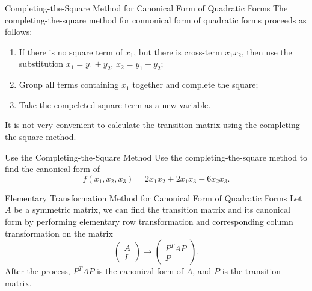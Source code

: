 \begin{proposition}{Completing-the-Square Method for Canonical Form of Quadratic
  Forms}{}
  The completing-the-square method for connonical form of quadratic forms
  proceeds as follows:
  \begin{enumerate}
  \item If there is no square term of $x_1$, but there is cross-term $x_1x_2$,
    then use the substitution $x_1 = y_1 + y_2$, $x_2 = y_1 - y_2$;
  \item Group all terms containing $x_1$ together and complete the square;
  \item Take the compeleted-square term as a new variable.
  \end{enumerate}
\end{proposition}

\begin{note}
  It is not very convenient to calculate the transition matrix using the
  completing-the-square method.
\end{note}

\begin{example}{Use the Completing-the-Square Method}{}
  Use the completing-the-square method to find the canonical form of
  \begin{equation}
    f(x_1, x_2, x_3) = 2x_1x_2 + 2x_1x_3 - 6x_2x_3.
  \end{equation}
\end{example}

\begin{solution}
  
\end{solution}

\begin{proposition}{Elementary Transformation Method for Canonical Form of
    Quadratic Forms}{}
  Let $A$ be a symmetric matrix, we can find the transition matrix and its
  canonical form by performing elementary row transformation and
  corresponding column transformation on the matrix
  \begin{equation}
    \begin{pmatrix}A\\I\end{pmatrix}\to\begin{pmatrix}P^TAP\\P\end{pmatrix}.
  \end{equation}
  After the process, $P^TAP$ is the canonical form of $A$, and $P$ is the
  transition matrix.
\end{proposition}

